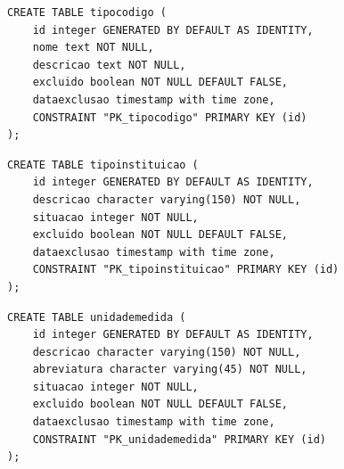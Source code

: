 \begin{quadro}[H]
\caption{Script SQL — Tabela tipocodigo}
\label{qua:script-tipocodigo}
\begin{minipage}{0.96\textwidth}
\begin{lstlisting}[style=academic-sql]
CREATE TABLE tipocodigo (
    id integer GENERATED BY DEFAULT AS IDENTITY,
    nome text NOT NULL,
    descricao text NOT NULL,
    excluido boolean NOT NULL DEFAULT FALSE,
    dataexclusao timestamp with time zone,
    CONSTRAINT "PK_tipocodigo" PRIMARY KEY (id)
);
\end{lstlisting}
\end{minipage}
\end{quadro}

\begin{quadro}[H]
\caption{Script SQL — Tabela tipoinstituicao}
\label{qua:script-tipoinstituicao}
\begin{minipage}{0.96\textwidth}
\begin{lstlisting}[style=academic-sql]
CREATE TABLE tipoinstituicao (
    id integer GENERATED BY DEFAULT AS IDENTITY,
    descricao character varying(150) NOT NULL,
    situacao integer NOT NULL,
    excluido boolean NOT NULL DEFAULT FALSE,
    dataexclusao timestamp with time zone,
    CONSTRAINT "PK_tipoinstituicao" PRIMARY KEY (id)
);
\end{lstlisting}
\end{minipage}
\end{quadro}

\begin{quadro}[H]
\caption{Script SQL — Tabela unidademedida}
\label{qua:script-unidademedida}
\begin{minipage}{0.96\textwidth}
\begin{lstlisting}[style=academic-sql]
CREATE TABLE unidademedida (
    id integer GENERATED BY DEFAULT AS IDENTITY,
    descricao character varying(150) NOT NULL,
    abreviatura character varying(45) NOT NULL,
    situacao integer NOT NULL,
    excluido boolean NOT NULL DEFAULT FALSE,
    dataexclusao timestamp with time zone,
    CONSTRAINT "PK_unidademedida" PRIMARY KEY (id)
);
\end{lstlisting}
\end{minipage}
\end{quadro}


